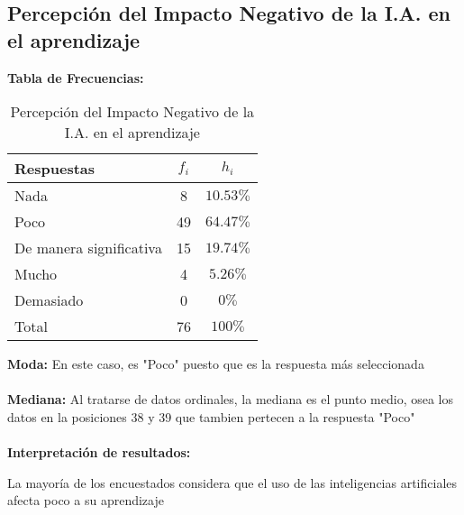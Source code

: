 \subsection{Percepción del Impacto Negativo de la I.A. en el aprendizaje}
\noindent\textbf{Tabla de Frecuencias:}

\begin{table}[h!]
	\centering
	\renewcommand{\arraystretch}{1.5}
	\begin{tabular}{l c c }
		\hline
		Respuestas & \(f_i\) & \(h_i\) \\
		\hline
		Nada & 8 & \(10.53\%\) \\
		Poco & 49 & \(64.47\%\) \\
		De manera significativa & 15 & \(19.74\%\) \\
		Mucho & 4 & \(5.26\%\) \\
		Demasiado & 0 & \(0\%\) \\
		\hline
		Total & 76 & \(100\%\) \\
		\hline
	\end{tabular}
	\caption{Percepción del Impacto Negativo de la I.A. en el aprendizaje}
	\label{tabla:percepciónNegativaEnElAprendizaje}
\end{table}

\noindent\textbf{Moda:} En este caso, es "Poco" puesto que es la respuesta más seleccionada \\ \\
\noindent\textbf{Mediana:} Al tratarse de datos ordinales, la mediana es el punto medio, osea los datos en la posiciones 38 y 39  que tambien pertecen a la respuesta "Poco" \\ \\
\noindent\textbf{Interpretación de resultados:}

La mayoría de los encuestados considera que el uso de las inteligencias artificiales afecta poco a su aprendizaje